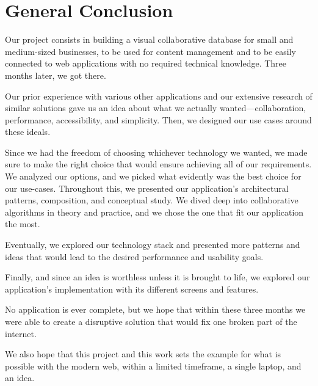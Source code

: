 \chapter*{General Conclusion}

Our project consists in building a visual collaborative database for small and medium-sized businesses, to be used for content management and to be easily connected to web applications with no required technical knowledge. Three months later, we got there.

Our prior experience with various other applications and our extensive research of similar solutions gave us an idea about what we actually wanted---collaboration, performance, accessibility, and simplicity.
Then, we designed our use cases around these ideals.

Since we had the freedom of choosing whichever technology we wanted, we made sure to make the right choice that would ensure achieving all of our requirements.
We analyzed our options, and we picked what evidently was the best choice for our use-cases.
Throughout this, we presented our application's architectural patterns, composition, and conceptual study.
We dived deep into collaborative algorithms in theory and practice, and we chose the one that fit our application the most.

Eventually, we explored our technology stack and presented more patterns and ideas that would lead to the desired performance and usability goals.

Finally, and since an idea is worthless unless it is brought to life, we explored our application's implementation with its different screens and features.

No application is ever complete, but we hope that within these three months we were able to create a disruptive solution that would fix one broken part of the internet.

We also hope that this project and this work sets the example for what is possible with the modern web, within a limited timeframe, a single laptop, and an idea.